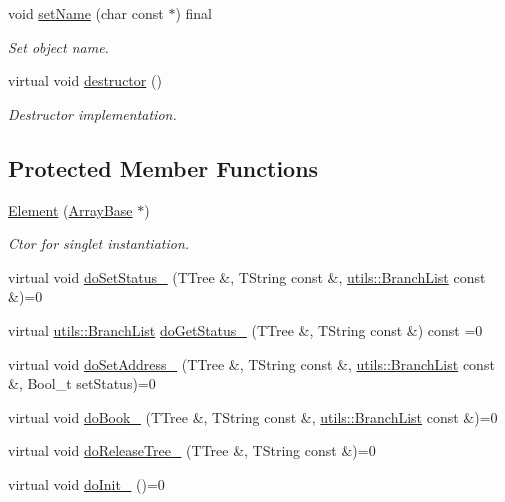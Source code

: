 \begin{DoxyCompactItemize}
void \hyperlink{classpanda_1_1Element_a16bd41e0e8ade3508f5227533a9c4a03}{setName} (char const $\ast$) final
\begin{DoxyCompactList}\small\item\em Set object name. \item\end{DoxyCompactList}\item 
virtual void \hyperlink{classpanda_1_1Element_a7ce6bca6d7422aac78576742dc67f0b8}{destructor} ()
\begin{DoxyCompactList}\small\item\em Destructor implementation. \item\end{DoxyCompactList}\end{DoxyCompactItemize}
\subsection*{Protected Member Functions}
\begin{DoxyCompactItemize}
\item 
\hyperlink{classpanda_1_1Element_a0500449175b8f307838ecf826cd02555}{Element} (\hyperlink{classpanda_1_1ArrayBase}{ArrayBase} $\ast$)
\begin{DoxyCompactList}\small\item\em Ctor for singlet instantiation. \item\end{DoxyCompactList}\item 
virtual void \hyperlink{classpanda_1_1Element_a1309a7039cde6233c19f3c488805015d}{doSetStatus\_\-} (TTree \&, TString const \&, \hyperlink{classpanda_1_1utils_1_1BranchList}{utils::BranchList} const \&)=0
\item 
virtual \hyperlink{classpanda_1_1utils_1_1BranchList}{utils::BranchList} \hyperlink{classpanda_1_1Element_aeac30a79f7ce156033a2dd7538fc919d}{doGetStatus\_\-} (TTree \&, TString const \&) const =0
\item 
virtual void \hyperlink{classpanda_1_1Element_a7321c2c15b55a8c306567a2ec7bafcff}{doSetAddress\_\-} (TTree \&, TString const \&, \hyperlink{classpanda_1_1utils_1_1BranchList}{utils::BranchList} const \&, Bool\_\-t setStatus)=0
\item 
virtual void \hyperlink{classpanda_1_1Element_af581eef9f2f192fbe4169d397a30eb48}{doBook\_\-} (TTree \&, TString const \&, \hyperlink{classpanda_1_1utils_1_1BranchList}{utils::BranchList} const \&)=0
\item 
virtual void \hyperlink{classpanda_1_1Element_a7ae1dd245caf18525c891d3d2f9323d5}{doReleaseTree\_\-} (TTree \&, TString const \&)=0
\item 
virtual void \hyperlink{classpanda_1_1Element_a374af043de4cf724fb6f640644ec35dc}{doInit\_\-} ()=0
\end{DoxyCompactItemize}
